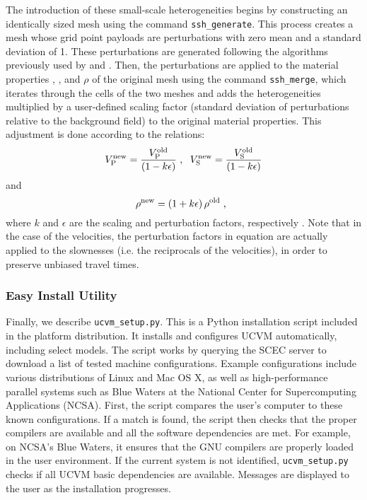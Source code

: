 The introduction of these small-scale heterogeneities begins by constructing an identically sized mesh using the command \texttt{ssh\_generate}. This process creates a mesh whose grid point payloads are perturbations with zero mean and a standard deviation of 1. These perturbations are generated following the algorithms previously used by \citet{Withers_2013_SCEC} and \citet{Savran_2014_SSA}. Then, the perturbations are applied to the material properties \vp{}, \vs{}, and $\rho$ of the original mesh using the command \texttt{ssh\_merge}, which iterates through the cells of the two meshes and adds the heterogeneities multiplied by a user-defined scaling factor (standard deviation of perturbations relative to the background field) to the original material properties. This adjustment is done according to the relations:
\begin{equation}
\label{eq:ssh.vel}
V_{\mathrm{P}}^{\mathrm{new}} = \frac{ V_{\mathrm{P}}^{\mathrm{old}} }{ (1 - k \epsilon) }
	\hspace{0.3em},
	\hspace{0.6em}
V_{\mathrm{S}}^{\mathrm{new}} = \frac{ V_{\mathrm{S}}^{\mathrm{old}} }{ (1 - k \epsilon) }
\end{equation}
%
and
%
\begin{equation}
\label{eq:ssh.density}
\rho^{\mathrm{new}} = (1 + k \epsilon) \, \rho^{\mathrm{old}}
	\hspace{0.3em},
	\hspace{0.6em}
\end{equation}
%
where $k$ and $\epsilon$ are the scaling and perturbation factors, respectively \citep[see][]{Withers_2013_SCEC, Savran_2014_SSA}. Note that in the case of the velocities, the perturbation factors in equation  are actually applied to the slownesses (i.e. the reciprocals of the velocities), in order to preserve unbiased travel times.

\subsubsection{Easy Install Utility}
\label{sec:easy.install}

Finally, we describe \texttt{ucvm\_setup.py}. This is a Python installation script included in the platform distribution. It installs and configures UCVM automatically, including select models. The script works by querying the SCEC server to download a list of tested machine configurations. Example configurations include various distributions of Linux and Mac OS X, as well as high-performance parallel systems such as Blue Waters at the National Center for Supercomputing Applications (NCSA). First, the script compares the user's computer to these known configurations. If a match is found, the script then checks that the proper compilers are available and all the software dependencies are met. For example, on NCSA's Blue Waters, it ensures that the GNU compilers are properly loaded in the user environment. If the current system is not identified, \texttt{ucvm\_setup.py} checks if all UCVM basic dependencies are available. Messages are displayed to the user as the installation progresses.


